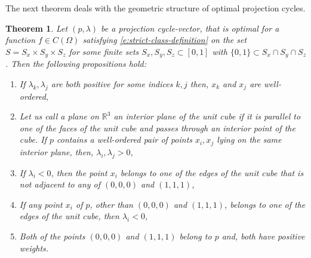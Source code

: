 \documentclass[12p]{article}
\numberwithin{equation}{section}
\newtheorem{theorem}{Theorem}[section]
\begin{document}
The next theorem deals with the geometric structure of optimal projection cycles. 
\begin{theorem} \label{t: Theorem 2.2}
    Let \((p,\lambda)\) be a projection cycle-vector, that is optimal for a function \(f \in C(\Omega)\) satisfying \eqref{e:strict-class-definition} on the set \(S=S_x\times S_y\times S_z\) for some finite sets \(S_x, S_y, S_z \subset [0,1]\) with \(\{0,1\}\subset S_x \cap S_y \cap S_z\). Then the following propositions hold:
    \begin{enumerate}

        \item[(a)] If \(\lambda_k,\lambda_j\) are both positive for some indices \(k,j\) then, \(x_k\) and \(x_j\) are well-ordered,
        \item[(b)] Let us call a plane on \(\mathbb{R}^3\) an interior plane of the unit cube if it is parallel to one of the faces of the unit cube and passes through an interior point of the cube. If \(p\) contains a well-ordered pair of points  \(x_i,x_j\) lying on the same interior plane, then, \(\lambda_i, \lambda_j>0\),
        \item[(c)] If \(\lambda_i<0 \), then the point \(x_i\) belongs to one of the edges of the unit cube that is not adjacent to  any of \((0,0,0)\) and \((1,1,1)\),
        \item[(d)]  If any point \(x_i\) of \(p\), other than \((0,0,0)\) and \((1,1,1)\), belongs to one of the edges of the unit cube, then \(\lambda_i<0\),
        \item[(e)] Both of the points \((0,0,0)\) and \((1,1,1)\) belong to \(p\) and, both have positive weights.
    \end{enumerate}
\end{theorem}
\end{document}
